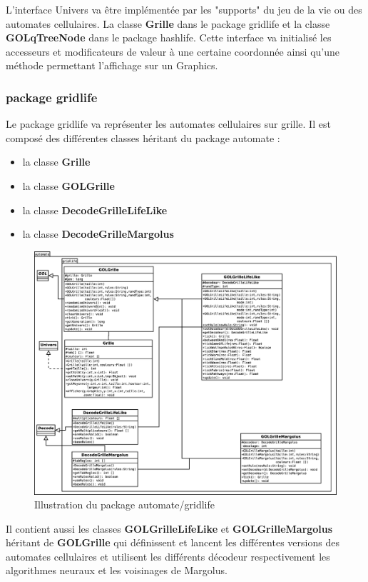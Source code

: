 \par L'interface Univers va être implémentée par les "supports" du jeu de la vie ou des automates cellulaires. La classe \textbf{Grille} dans le package gridlife et la classe \textbf{GOLqTreeNode} dans le package hashlife. Cette interface va initialisé les accesseurs et modificateurs de valeur à une certaine coordonnée ainsi qu'une méthode permettant l'affichage sur un Graphics.
\subsubsection{package gridlife}
\par Le package gridlife va représenter les automates cellulaires sur grille. Il est composé des différentes classes héritant du package automate : \begin{itemize}
    \item la classe \textbf{Grille}
    \item la classe \textbf{GOLGrille}
    \item la classe \textbf{DecodeGrilleLifeLike}
    \item la classe \textbf{DecodeGrilleMargolus}
\end{itemize}

\begin{figure}[htp]
\centering
\includegraphics[scale=0.25]{images/Diagramme/package_automate_gridlife.eps}
\caption{\label{fig:Automate/gridlife}Illustration du package automate/gridlife}
\end{figure}
\par Il contient aussi les classes \textbf{GOLGrilleLifeLike} et \textbf{GOLGrilleMargolus} héritant de \textbf{GOLGrille} qui définissent et lancent les différentes versions des automates cellulaires et utilisent les différents décodeur respectivement les algorithmes neuraux et les voisinages de Margolus.
